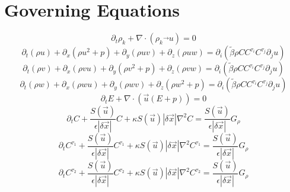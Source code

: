 \documentclass[10pt,letterpaper]{article}
\begin{document}
  \section*{Governing Equations}
  \begin{equation}
    \tag{1a}
    \partial_t \rho_k + \nabla \cdot \left( \rho_k \vec{}u \right) = 0
  \end{equation}
  \begin{equation}
    \tag{1b}
    \partial_t\left(\rho u\right) + \partial_x\left(\rho u^2 + p\right)
                                  + \partial_y\left(\rho u v\right) 
                                  + \partial_z\left(\rho u w\right) 
                                  = \partial_i\left(\widetilde{\beta}\rho C C^{\tau_i}C^{\tau_j}\partial_ju\right)
  \end{equation}
  \begin{equation}
    \tag{1c}
    \partial_t\left(\rho v\right) + \partial_x\left(\rho v u\right)
                                  + \partial_y\left(\rho v^2 + p\right) 
                                  + \partial_z\left(\rho v w\right) 
                                  = \partial_i\left(\widetilde{\beta}\rho C C^{\tau_i}C^{\tau_j}\partial_ju\right)
  \end{equation}
  \begin{equation}
    \tag{1d}
    \partial_t\left(\rho w\right) + \partial_x\left(\rho w u\right)
                                  + \partial_y\left(\rho w v\right) 
                                  + \partial_z\left(\rho w^2 + p\right) 
                                  = \partial_i\left(\widetilde{\beta}\rho C C^{\tau_i}C^{\tau_j}\partial_ju\right)
  \end{equation}
  \begin{equation}
    \tag{1e}
    \partial_tE + \nabla\cdot\left(\vec{u}(E+p)\right)=0
  \end{equation}
  \begin{equation}
    \tag{1f}
    \partial_tC + \frac{S(\vec{u})}{\epsilon|\delta\vec{x}|}C + \kappa S(\vec{u})|\delta\vec{x}|\nabla^2 C = \frac{S(\vec{u})}{\epsilon|\delta\vec{x}|}G_\rho
  \end{equation}
  \begin{equation}
    \tag{1g}
    \partial_tC^{\tau_1} + \frac{S(\vec{u})}{\epsilon|\delta\vec{x}|}C^{\tau_1} + \kappa S(\vec{u})|\delta\vec{x}|\nabla^2 C^{\tau_1} = \frac{S(\vec{u})}{\epsilon|\delta\vec{x}|}G_\rho
  \end{equation}
  \begin{equation}
    \tag{1h}
    \partial_tC^{\tau_2} + \frac{S(\vec{u})}{\epsilon|\delta\vec{x}|}C^{\tau_2} + \kappa S(\vec{u})|\delta\vec{x}|\nabla^2 C^{\tau_2} = \frac{S(\vec{u})}{\epsilon|\delta\vec{x}|}G_\rho
  \end{equation}
\end{document}
